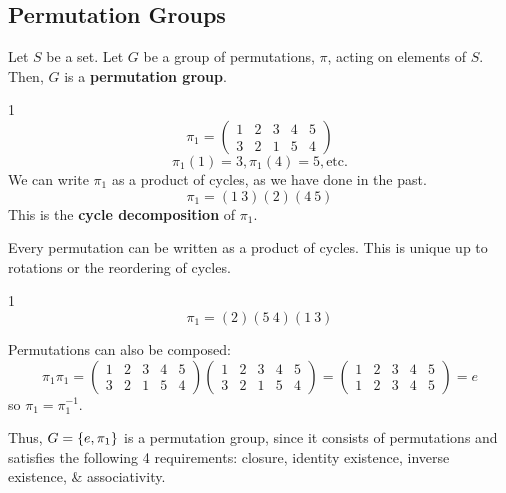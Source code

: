 \label{33-0429}
\subsection{Permutation Groups}
Let $S$ be a set. Let $G$ be a group of permutations, $\pi$,
acting on elements of $S$. Then, $G$ is a \textbf{permutation group}.

\begin{example}1
    \[ \pi_1 = \begin{pmatrix}
        1 & 2 & 3 & 4 & 5 \\ 3 & 2 & 1 & 5 & 4
    \end{pmatrix}
        \]
    \[
        \pi_1(1) = 3, \pi_1(4) = 5, \text{etc.}
    \]
    We can write $\pi_1$ as a product of cycles, as we have 
    done in the past. 
    \[ \pi_1 = (1 \ 3) (2) (4 \ 5)\]
    This is the \textbf{cycle decomposition} of $\pi_1$. 
\end{example}
\begin{theorem}
    Every permutation can be written as a product of cycles. 
    This is unique up to rotations or the reordering of cycles. 
\end{theorem}
\begin{example}1
    \[ \pi_1 = (2) (5 \ 4) (1 \ 3) \]
\end{example}
Permutations can also be composed: 
\[
    \pi_1 \pi_1 = 
    \begin{pmatrix}
        1 & 2 & 3 & 4 & 5 \\ 3 & 2 & 1 & 5 & 4
    \end{pmatrix}
    \begin{pmatrix}
        1 & 2 & 3 & 4 & 5 \\ 3 & 2 & 1 & 5 & 4
    \end{pmatrix}
    = \begin{pmatrix}
        1 & 2 & 3 & 4 & 5 \\ 1 & 2 & 3 & 4 & 5
    \end{pmatrix} = e
\]
so $\pi_1 = \pi_1^{-1}$. 

Thus, $G = \left\{e, \pi_1\right\}$ is a permutation group, since it 
consists of permutations and satisfies the following 4
requirements: closure, identity existence, inverse existence,
\& associativity. 

